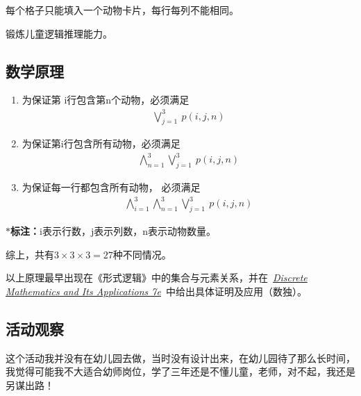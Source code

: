 \documentclass[a4paper, 12pt, oneside]{article}
\begin{document}
    \begin{tcolorbox}[colback=yellow!10!white,colframe=red!75!black,title=玩法介绍]
        每个格子只能填入一个动物卡片，每行每列不能相同。
    \end{tcolorbox}
    \begin{tcolorbox}[colback=yellow!10!white,colframe=red!75!black,title=设计理由]
        锻炼儿童逻辑推理能力。
    \end{tcolorbox}
    \subsection{数学原理}
        \begin{tcolorbox}[colback=red!5!white,colframe=red!75!black]
            \begin{enumerate}
                \item 为保证第 i行包含第n个动物，必须满足
                    $$
                    \begin{matrix}
                        \bigvee_{j=1}^3 ~p\left(i, j, n\right)
                    \end{matrix}
                    $$
                \item 为保证第i行包含所有动物，必须满足
                    $$
                    \begin{matrix}
                        \bigwedge_{n=1}^3\bigvee_{j=1}^3 ~p\left(i, j, n\right)
                    \end{matrix}
                    $$
                \item 为保证每一行都包含所有动物， 必须满足
                    $$
                    \begin{matrix}
                        \bigwedge_{i=1}^3\bigwedge_{n=1}^3\bigvee_{j=1}^3 ~p\left(i, j ,n\right)
                    \end{matrix}
                    $$
            \end{enumerate}
            \tcblower
            \hfill$\ast$\textbf{标注：}i表示行数，j表示列数，n表示动物数量。
        \end{tcolorbox}
        
        综上，共有$3\times3\times3=27$种不同情况。\par
        以上原理最早出现在《形式逻辑》中的集合与元素关系，并在~\href{https://www.amazon.com/Discrete-Mathematics-Its-Applications-Seventh/dp/0073383090}{\textit{Discrete Mathematics and Its Applications 7e}}~中给出具体证明及应用（数独）。
    \subsection{活动观察}
    这个活动我并没有在幼儿园去做，当时没有设计出来，在幼儿园待了那么长时间，我觉得可能我不大适合幼师岗位，学了三年还是不懂儿童，老师，对不起，我还是另谋出路！
\end{document}
